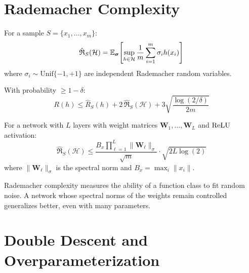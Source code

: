 \section{Rademacher Complexity}
\label{sec:rademacher}

\begin{definition}
\label{def:rademacher}
For a sample $S = \{x_1, \ldots, x_m\}$:
\begin{equation}
\hat{\mathfrak{R}}_S(\mathcal{H}) = \mathbb{E}_{\boldsymbol{\sigma}}\!\left[\sup_{h \in \mathcal{H}} \frac{1}{m}\sum_{i=1}^{m} \sigma_i h(x_i)\right]
\end{equation}
where $\sigma_i \sim \text{Unif}\{-1, +1\}$ are independent Rademacher
random variables.
\end{definition}

\begin{theorem}
\label{thm:rademacher-bound}
With probability $\geq 1 - \delta$:
\begin{equation}
R(h) \leq \hat{R}_S(h) + 2\,\hat{\mathfrak{R}}_S(\mathcal{H}) + 3\sqrt{\frac{\log(2/\delta)}{2m}}
\end{equation}
\end{theorem}

\begin{proposition}
\label{prop:spectral-rademacher}
For a network with $L$ layers with weight matrices $\mathbf{W}_1, \ldots, \mathbf{W}_L$
and $\mathrm{ReLU}$ activation:
\begin{equation}
\hat{\mathfrak{R}}_S(\mathcal{H}) \leq \frac{B_x \prod_{\ell=1}^{L} \|\mathbf{W}_\ell\|_{\sigma}}{\sqrt{m}} \cdot \sqrt{2L\log(2)}
\end{equation}
where $\|\mathbf{W}_\ell\|_{\sigma}$ is the spectral norm and
$B_x = \max_i \|x_i\|$.
\end{proposition}

\begin{intuition}
Rademacher complexity measures the ability of a function class
to fit random noise. A network whose spectral norms of the weights
remain controlled generalizes better, even with many parameters.
\end{intuition}

\section{Double Descent and Overparameterization}
\label{sec:double-descent}

